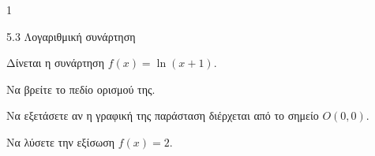 \begin{ylh}{1}
\item 5.3 Λογαριθμική συνάρτηση
\end{ylh}
Δίνεται η συνάρτηση $f(x) = \ln(x + 1)$.
\begin{alist}
\item Να βρείτε το πεδίο ορισμού της.
\item Να εξετάσετε αν η γραφική της παράσταση διέρχεται από το σημείο $O(0, 0)$.
\item Να λύσετε την εξίσωση $f(x) = 2$.
\end{alist}


